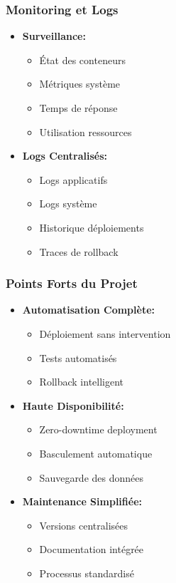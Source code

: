 \documentclass[aspectratio=169]{beamer}
\begin{document}
\begin{frame}
    \frametitle{Monitoring et Logs}
    \begin{itemize}
        \item \textbf{Surveillance:}
        \begin{itemize}
            \item État des conteneurs
            \item Métriques système
            \item Temps de réponse
            \item Utilisation ressources
        \end{itemize}
        \item \textbf{Logs Centralisés:}
        \begin{itemize}
            \item Logs applicatifs
            \item Logs système
            \item Historique déploiements
            \item Traces de rollback
        \end{itemize}
    \end{itemize}
\end{frame}

\begin{frame}
    \frametitle{Points Forts du Projet}
    \begin{itemize}
        \item \textbf{Automatisation Complète:}
        \begin{itemize}
            \item Déploiement sans intervention
            \item Tests automatisés
            \item Rollback intelligent
        \end{itemize}
        \item \textbf{Haute Disponibilité:}
        \begin{itemize}
            \item Zero-downtime deployment
            \item Basculement automatique
            \item Sauvegarde des données
        \end{itemize}
        \item \textbf{Maintenance Simplifiée:}
        \begin{itemize}
            \item Versions centralisées
            \item Documentation intégrée
            \item Processus standardisé
        \end{itemize}
    \end{itemize}
\end{frame}
\end{document}

